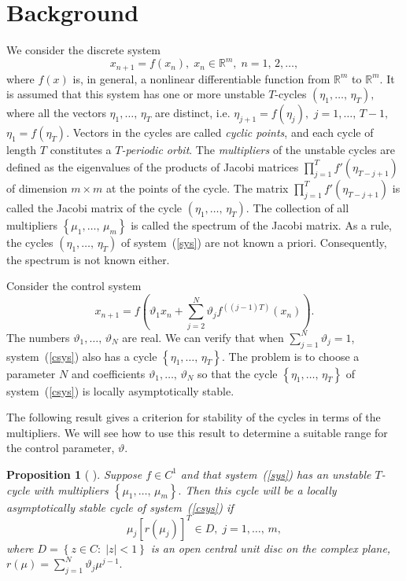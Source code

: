 \documentclass[12pt,a4paper]{amsart}
\newtheorem{prop}{Proposition}
\begin{document}
\section{Background} \label{sec:background}

We consider the discrete system 
\begin{equation}\label{sys}
x_{n+1}=f(x_n),\;x_n\in {\mathbb R}^m,\;n=1,\,2,\ldots,
\end{equation}
where $f(x)$ is, in general, a nonlinear differentiable function from ${\mathbb R}^m$ to $\mathbb{R}^m$.  It is assumed that this system has one or more unstable 
$T$-cycles $\left(\eta_1,\ldots,\,\eta_T\right),$ where all the vectors $\eta_1,\ldots,\,\eta_T$ are distinct, i.e. $\eta_{j+1}=f(\eta_j),$ 
$j=1,\ldots,\,T-1,$ $\eta_1=f(\eta_T).$ Vectors in the cycles are called {\it cyclic points}, and each cycle of length $T$ constitutes a {\it $T$-periodic orbit}. The {\it multipliers} of the 
unstable cycles are defined as the eigenvalues of the products of Jacobi matrices $\prod\limits_{j=1}^T{f'(\eta_{T-j+1})}$ of dimension 
$m\times m$ at the points of the cycle. The matrix $\prod\limits_{j=1}^T{f'(\eta_{T-j+1})}$ is called the Jacobi matrix of the cycle 
$\left(\eta_1,\ldots,\,\eta_T\right).$ The collection of all multipliers $\left\{\mu_1,\ldots,\,\mu_m\right\}$ is called the spectrum of 
the Jacobi matrix. As a rule, the cycles $\left(\eta_1,\ldots,\,\eta_T\right)$ of system~(\ref{sys}) are not known a priori. Consequently, 
the spectrum is not known either.

Consider the control system	
\begin{equation}\label{csys}
x_{n+1}=f\left(\vartheta_1 x_n + \sum\limits_{j=2}^N{\vartheta_j f^{\left((j-1)T\right)}}(x_n)\right).
\end{equation}
The numbers $\vartheta_1,\ldots,\,\vartheta_N$ are real. We can verify that when $\sum\limits_{j=1}^N{\vartheta_j}=1$, 
system~(\ref{csys}) also has a cycle $\left\{\eta_1,\ldots,\,\eta_T\right\}.$ The problem is to choose a parameter $N$ 
and coefficients $\vartheta_1,\ldots,\,\vartheta_N$ so that the cycle $\left\{\eta_1,\ldots,\,\eta_T\right\}$ of system~(\ref{csys}) 
is locally asymptotically stable.

The following result gives a criterion for stability of the cycles in terms of the multipliers. We will see how to use this result to determine a suitable range for the control parameter, $\vartheta$.
\begin{prop}[\cite{DSI} ]\label{Prop1}
Suppose $f\in C^1$ and that system~(\ref{sys}) has an unstable $T$-cycle with multipliers $\left\{\mu_1,\ldots,\,\mu_m\right\}.$
Then this cycle will be a locally asymptotically stable cycle of system~(\ref{csys}) if 
$$
\mu_j \left[r(\mu_j)\right]^T \in D,\;j=1,\ldots,\,m,
$$
where $D=\left\{z\in C:\;|z|<1\right\}$ is an open central unit disc on the complex plane, $r(\mu)=\sum\limits_{j=1}^N{\vartheta_j \mu^{j-1}}.$
\end{prop}
\end{document}
